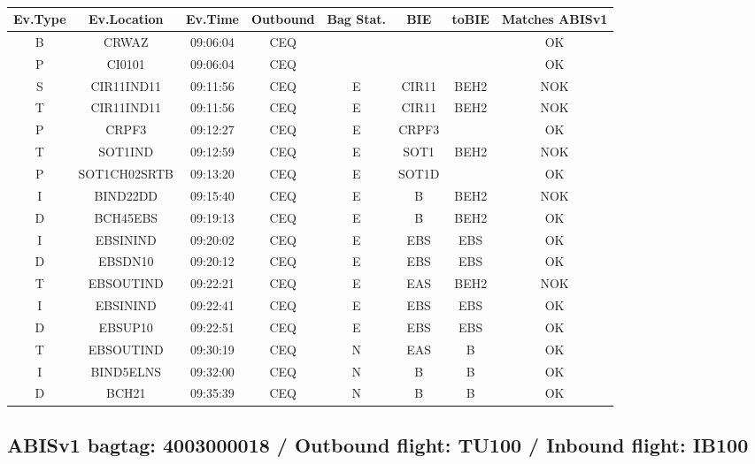 \documentclass{report}
\begin{document}
\paragraph{}
\begin{longtable}{cccccccc}    \toprule
\rowcolor{white!50}
\textbf{Ev.Type} & \textbf{Ev.Location} & \textbf{Ev.Time} & \textbf{Outbound} & \textbf{Bag Stat.} & \textbf{BIE} & \textbf{toBIE} & \textbf{Matches ABISv1} \\\midrule
B & CRWAZ & 09:06:04  & CEQ &  &  &  & OK\\
P & CI0101 & 09:06:04  & CEQ &  &  &  & OK\\
S & CIR11IND11 & 09:11:56  & CEQ & E & CIR11 & BEH2 & NOK\\
T & CIR11IND11 & 09:11:56  & CEQ & E & CIR11 & BEH2 & NOK\\
P & CRPF3 & 09:12:27  & CEQ & E & CRPF3 &  & OK\\
T & SOT1IND & 09:12:59  & CEQ & E & SOT1 & BEH2 & NOK\\
P & SOT1CH02SRTB & 09:13:20  & CEQ & E & SOT1D &  & OK\\
I & BIND22DD & 09:15:40  & CEQ & E & B & BEH2 & NOK\\
D & BCH45EBS & 09:19:13  & CEQ & E & B & BEH2 & OK\\
I & EBSININD & 09:20:02  & CEQ & E & EBS & EBS & OK\\
D & EBSDN10 & 09:20:12  & CEQ & E & EBS & EBS & OK\\
T & EBSOUTIND & 09:22:21  & CEQ & E & EAS & BEH2 & NOK\\
I & EBSININD & 09:22:41  & CEQ & E & EBS & EBS & OK\\
D & EBSUP10 & 09:22:51  & CEQ & E & EBS & EBS & OK\\
T & EBSOUTIND & 09:30:19  & CEQ & N & EAS & B & OK\\
I & BIND5ELNS & 09:32:00  & CEQ & N & B & B & OK\\
D & BCH21 & 09:35:39  & CEQ & N & B & B & OK\\
\bottomrule
\end{longtable}
\subsection*{ABISv1 bagtag: 4003000018 / Outbound flight: TU100 / Inbound flight: IB100}
\end{document}
